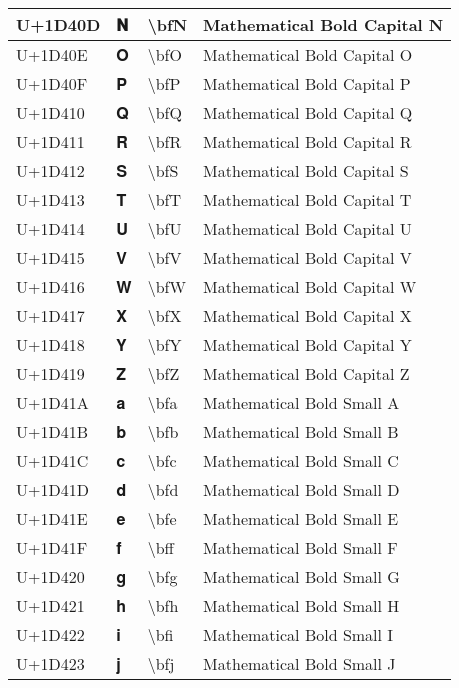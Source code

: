 \begin{table}[h]
\begin{tabulary}{\linewidth}{|L|L|L|L|}
\hline
U+1D40D & 𝐍 & {\textbackslash}bfN & Mathematical Bold Capital N \\
\hline
U+1D40E & 𝐎 & {\textbackslash}bfO & Mathematical Bold Capital O \\
\hline
U+1D40F & 𝐏 & {\textbackslash}bfP & Mathematical Bold Capital P \\
\hline
U+1D410 & 𝐐 & {\textbackslash}bfQ & Mathematical Bold Capital Q \\
\hline
U+1D411 & 𝐑 & {\textbackslash}bfR & Mathematical Bold Capital R \\
\hline
U+1D412 & 𝐒 & {\textbackslash}bfS & Mathematical Bold Capital S \\
\hline
U+1D413 & 𝐓 & {\textbackslash}bfT & Mathematical Bold Capital T \\
\hline
U+1D414 & 𝐔 & {\textbackslash}bfU & Mathematical Bold Capital U \\
\hline
U+1D415 & 𝐕 & {\textbackslash}bfV & Mathematical Bold Capital V \\
\hline
U+1D416 & 𝐖 & {\textbackslash}bfW & Mathematical Bold Capital W \\
\hline
U+1D417 & 𝐗 & {\textbackslash}bfX & Mathematical Bold Capital X \\
\hline
U+1D418 & 𝐘 & {\textbackslash}bfY & Mathematical Bold Capital Y \\
\hline
U+1D419 & 𝐙 & {\textbackslash}bfZ & Mathematical Bold Capital Z \\
\hline
U+1D41A & 𝐚 & {\textbackslash}bfa & Mathematical Bold Small A \\
\hline
U+1D41B & 𝐛 & {\textbackslash}bfb & Mathematical Bold Small B \\
\hline
U+1D41C & 𝐜 & {\textbackslash}bfc & Mathematical Bold Small C \\
\hline
U+1D41D & 𝐝 & {\textbackslash}bfd & Mathematical Bold Small D \\
\hline
U+1D41E & 𝐞 & {\textbackslash}bfe & Mathematical Bold Small E \\
\hline
U+1D41F & 𝐟 & {\textbackslash}bff & Mathematical Bold Small F \\
\hline
U+1D420 & 𝐠 & {\textbackslash}bfg & Mathematical Bold Small G \\
\hline
U+1D421 & 𝐡 & {\textbackslash}bfh & Mathematical Bold Small H \\
\hline
U+1D422 & 𝐢 & {\textbackslash}bfi & Mathematical Bold Small I \\
\hline
U+1D423 & 𝐣 & {\textbackslash}bfj & Mathematical Bold Small J \\

\end{tabulary}
\end{table}

